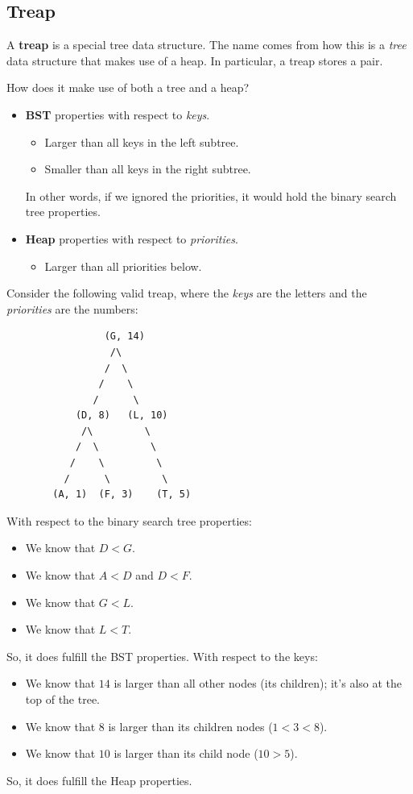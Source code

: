 \documentclass[letterpaper]{article}
\begin{document}
\subsection{Treap}
A \textbf{treap} is a special tree data structure. The name comes from how this is a \emph{tree} data structure that makes use of a heap. In particular, a treap stores a  pair. 

\bigskip 

How does it make use of both a tree and a heap? 
\begin{itemize}
    \item \textbf{BST} properties with respect to \emph{keys}.
    \begin{itemize}
        \item Larger than all keys in the left subtree. 
        \item Smaller than all keys in the right subtree. 
    \end{itemize}
    In other words, if we ignored the priorities, it would hold the binary search tree properties. 

    \item \textbf{Heap} properties with respect to \emph{priorities}. 
    \begin{itemize}
        \item Larger than all priorities below. 
    \end{itemize}
\end{itemize}

Consider the following valid treap, where the \emph{keys} are the letters and the \emph{priorities} are the numbers: 
\begin{verbatim}
                 (G, 14)
                  /\ 
                 /  \ 
                /    \ 
               /      \ 
            (D, 8)   (L, 10)
             /\         \ 
            /  \         \ 
           /    \         \ 
          /      \         \ 
        (A, 1)  (F, 3)    (T, 5)
\end{verbatim}
With respect to the binary search tree properties: 
\begin{itemize}
    \item We know that $D < G$. 
    \item We know that $A < D$ and $D < F$. 
    \item We know that $G < L$. 
    \item We know that $L < T$. 
\end{itemize}
So, it does fulfill the BST properties. With respect to the keys: 
\begin{itemize}
    \item We know that $14$ is larger than all other nodes (its children); it's also at the top of the tree. 
    \item We know that $8$ is larger than its children nodes ($1 < 3 < 8$). 
    \item We know that $10$ is larger than its child node ($10 > 5$). 
\end{itemize}
So, it does fulfill the Heap properties. 
\end{document}
